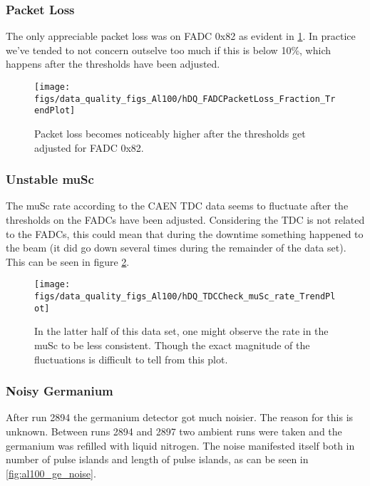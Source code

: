 \documentclass[a4paper]{article}
\begin{document}
\subsubsection{Packet Loss}
\label{sec:al100_packet_loss}

The only appreciable packet loss was on FADC 0x82 as evident in \ref{fig:al100_packet_loss}.
In practice we've tended to not concern outselve too much if this is below 10\%, which
happens after the thresholds have been adjusted.

\begin{figure}
  \texttt{[image: figs/data\_quality\_figs\_Al100/hDQ\_FADCPacketLoss\_Fraction\_TrendPlot]}
  \caption{Packet loss becomes noticeably higher after the thresholds get adjusted for
    FADC 0x82.}
  \label{fig:al100_packet_loss}
\end{figure}


\subsubsection{Unstable muSc}

The muSc rate according to the CAEN TDC data seems to fluctuate after the thresholds
on the FADCs have been adjusted. Considering the TDC is not related to the FADCs,
this could mean that during the downtime something happened to the beam (it did go down
several times during the remainder of the data set). This can be seen in figure \ref{fig:al100_musc_rate}.

\begin{figure}
  \texttt{[image: figs/data\_quality\_figs\_Al100/hDQ\_TDCCheck\_muSc\_rate\_TrendPlot]}
  \caption{In the latter half of this data set, one might
    observe the rate in the muSc to be less consistent. Though
    the exact magnitude of the fluctuations is difficult
    to tell from this plot.}
  \label{fig:al100_musc_rate}
\end{figure}



\subsubsection{Noisy Germanium}
\label{sec:al100_ge_noisy}

After run 2894 the germanium detector got much noisier. The reason for this is unknown.
Between runs 2894 and 2897 two ambient runs were taken and the germanium was refilled with liquid nitrogen.
The noise manifested itself both in number of pulse islands and length of pulse islands, as can be
seen in \ref{fig:al100_ge_noise}. 
\end{document}
